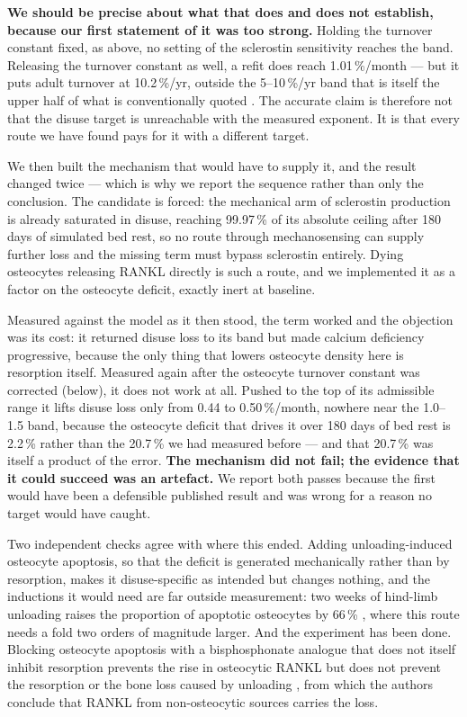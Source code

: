\documentclass[10pt,letterpaper]{article}
\begin{document}
\textbf{We should be precise about what that does and does not establish,
because our first statement of it was too strong.} Holding the turnover
constant fixed, as above, no setting of the sclerostin sensitivity reaches the
band. Releasing the turnover constant as well, a refit does reach
1.01\,\%/month --- but it puts adult turnover at 10.2\,\%/yr, outside the
5--10\,\%/yr band that is itself the upper half of what is conventionally
quoted \cite{parfitt2002}. The accurate claim is therefore not that the disuse
target is unreachable with the measured exponent. It is that every route we
have found pays for it with a different target.

We then built the mechanism that would have to supply it, and the result
changed twice --- which is why we report the sequence rather than only the
conclusion. The candidate is forced: the mechanical arm of sclerostin
production is already saturated in disuse, reaching 99.97\,\% of its absolute
ceiling after 180 days of simulated bed rest, so no route through
mechanosensing can supply further loss and the missing term must bypass
sclerostin entirely. Dying osteocytes releasing RANKL directly is such a route,
and we implemented it as a factor on the osteocyte deficit, exactly inert at
baseline.

Measured against the model as it then stood, the term worked and the objection
was its cost: it returned disuse loss to its band but made calcium deficiency
progressive, because the only thing that lowers osteocyte density here is
resorption itself. Measured again after the osteocyte turnover constant was
corrected (below), it does not work at all. Pushed to the top of its admissible
range it lifts disuse loss only from 0.44 to 0.50\,\%/month, nowhere near the
1.0--1.5 band, because the osteocyte deficit that drives it over 180 days of bed
rest is 2.2\,\% rather than the 20.7\,\% we had measured before --- and that
20.7\,\% was itself a product of the error. \textbf{The mechanism did not fail;
the evidence that it could succeed was an artefact.} We report both passes
because the first would have been a defensible published result and was wrong
for a reason no target would have caught.

Two independent checks agree with where this ended. Adding unloading-induced
osteocyte apoptosis, so that the deficit is generated mechanically rather than
by resorption, makes it disuse-specific as intended but changes nothing, and the
inductions it would need are far outside measurement: two weeks of hind-limb
unloading raises the proportion of apoptotic osteocytes by 66\,\%
\cite{basso2006}, where this route needs a fold two orders of magnitude larger.
And the experiment has been done. Blocking osteocyte apoptosis with a
bisphosphonate analogue that does not itself inhibit resorption prevents the
rise in osteocytic RANKL but does not prevent the resorption or the bone loss
caused by unloading \cite{plotkin2015}, from which the authors conclude that
RANKL from non-osteocytic sources carries the loss.
\end{document}
